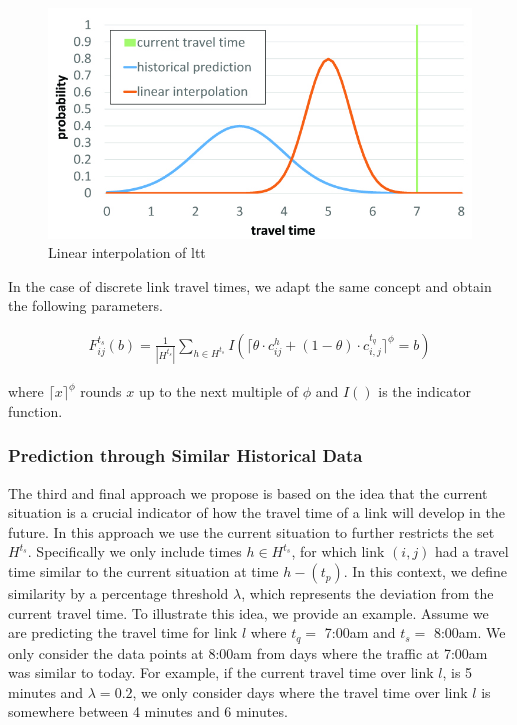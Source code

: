 \begin{figure}[h]
    \centering
    \includegraphics[width=0.80\columnwidth]{figures/tt_interpolation.jpg}
    \caption{Linear interpolation of ltt}
    \label{fig:interpolation}
\end{figure}

In the case of discrete link travel times, we adapt the same concept and obtain the following parameters.

\begin{gather}
F_{ij}^{t_s}(b) = \frac{1}{|H^{t_s}|}\sum_{h\in H^{t_s}} I(\lceil\theta \cdot 
c_{ij}^h + (1-\theta)\cdot c_{i,j}^{t_q}\rceil^\phi = b)
\end{gather}

where $\lceil x \rceil^\phi$ rounds $x$ up to the next multiple of $\phi$ and $I()$ is the indicator function.

\subsubsection{Prediction through Similar Historical Data}
\label{subsec:SH}
The third and final approach we propose is based on the idea that the current situation is a crucial indicator of how the travel time of a link will develop in the future. In this approach we use the current situation to further restricts the set $H^{t_s}$. Specifically we only include times $h \in H^{t_s}$, for which link $(i, j)$ had a travel time similar to the current situation at time $h-(t_p)$. In this context, we define similarity by a percentage threshold $\lambda$, which represents the deviation from the current travel time. To illustrate this idea, we provide an example. Assume we are predicting the travel time for link $l$ where $t_q=$ 7:00am and $t_s=$ 8:00am. We only consider the data points at 8:00am from days where the traffic at 7:00am was similar to today. For example, if the current travel time over link $l$, is 5 minutes and $\lambda = 0.2$, we only consider days where the travel time over link $l$ is somewhere between 4 minutes and 6 minutes.

